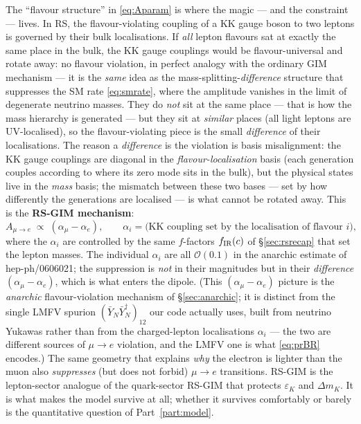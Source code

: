 \documentclass[11pt]{article}
\newcommand{\eps}{\varepsilon}
\newcommand{\YNb}{\bar Y_N}
\newcommand{\spur}{(\YNb\YNb^\dagger)_{12}}
\theoremstyle{definition}
\begin{document}
The ``flavour structure'' in \eqref{eq:Aparam} is where the magic --- and the
constraint --- lives. In RS, the flavour-violating coupling of a KK gauge boson to
two leptons is governed by their bulk localisations. If \emph{all} lepton flavours
sat at exactly the same place in the bulk, the KK gauge couplings would be
flavour-universal and rotate away: no flavour violation, in perfect analogy with
the ordinary GIM mechanism --- it is the \emph{same} idea as the
mass-splitting-\emph{difference} structure that suppresses the SM rate
\eqref{eq:smrate}, where the amplitude vanishes in the limit of degenerate
neutrino masses. They do \emph{not} sit at the same place --- that is
how the mass hierarchy is generated --- but they sit at \emph{similar} places (all
light leptons are UV-localised), so the flavour-violating piece is the small
\emph{difference} of their localisations. The reason a \emph{difference} is the
violation is basis misalignment: the KK gauge couplings are diagonal in the
\emph{flavour-localisation} basis (each generation couples according to where its
zero mode sits in the bulk), but the physical states live in the \emph{mass}
basis; the mismatch between these two bases --- set by how differently the
generations are localised --- is what cannot be rotated away. This is the
\textbf{RS-GIM mechanism}:
\begin{equation}
A_{\mu\to e} \;\propto\; (\alpha_\mu - \alpha_e),
\qquad \alpha_i = \text{(KK coupling set by the localisation of flavour } i),
\end{equation}
where the $\alpha_i$ are controlled by the same $f$-factors $f_{\rm IR}(c)$ of
\S\ref{sec:rsrecap} that set the lepton masses. The individual $\alpha_i$ are all
$\mathcal{O}(0.1)$ in the anarchic estimate of hep-ph/0606021; the suppression is
\emph{not} in their magnitudes but in their \emph{difference}
$(\alpha_\mu-\alpha_e)$, which is what enters the dipole. (This
$(\alpha_\mu-\alpha_e)$ picture is the \emph{anarchic} flavour-violation
mechanism of \S\ref{sec:anarchic}; it is distinct from the single LMFV spurion
$\spur$ our code actually uses, built from neutrino Yukawas rather than from the
charged-lepton localisations $\alpha_i$ --- the two are different sources of
$\mu\to e$ violation, and the LMFV one is what \eqref{eq:prBR} encodes.) The same
geometry that explains \emph{why} the electron is lighter than the muon also
\emph{suppresses} (but does not forbid) $\mu\to e$ transitions. RS-GIM is the
lepton-sector analogue of the quark-sector RS-GIM that protects $\eps_K$ and
$\Delta m_K$. It is what makes the model survive at all; whether it survives
comfortably or barely is the quantitative question of Part~\ref{part:model}.
\end{document}

